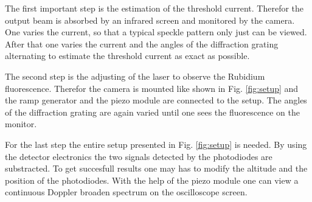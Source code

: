 The first important step is the estimation of the threshold current. Therefor
the output beam is absorbed by an infrared screen and monitored by the camera.
One varies the current, so that a typical speckle pattern only just can be viewed.
After that one varies the current and the angles of the diffraction grating alternating
to estimate the threshold current as exact as possible.

The second step is the adjusting of the laser to observe the Rubidium fluorescence.
Therefor the camera is mounted like shown in Fig. \ref{fig:setup} and the ramp generator
and the piezo module are connected to the setup. The angles of the diffraction grating are
again varied until one sees the fluorescence on the monitor.

For the last step the entire setup presented in Fig. \ref{fig:setup} is needed.
By using the detector electronics the two signals detected by the photodiodes are
substracted. To get succesfull results one may has to modify the altitude and the position of the
photodiodes. With the help of the piezo module one can view a continuous
Doppler broaden spectrum on the oscilloscope screen.
